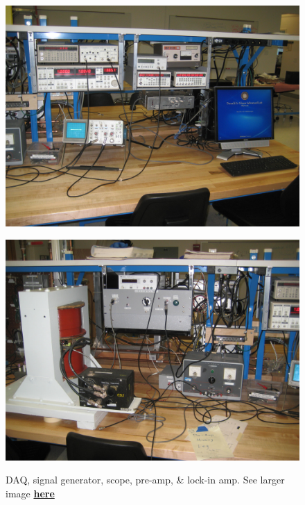 \documentclass{../lab}
\begin{document}
\begin{figure}[h]
\begin{minipage}{0.32\textwidth}
    \href{http://experimentationlab.berkeley.edu/sites/default/files/images/NMR_Exp_3496.jpg}{\includegraphics[width=\linewidth,keepaspectratio]{images/NMR_Exp_3496.jpg}}
    \caption{DAQ, signal generator, scope, pre-amp, & lock-in amp. See larger image \href{http://experimentationlab.berkeley.edu/sites/default/files/images/NMR_Exp_3496.jpg}{\textbf{here}}}
\end{minipage}
\begin{minipage}{0.32\textwidth}
    \href{http://experimentationlab.berkeley.edu/sites/default/files/images/NMR_Exp_3557.jpg}{\includegraphics[width=\linewidth,keepaspectratio]{images/NMR_Exp_3557.jpg}}

\end{minipage}
\end{figure}
\end{document}
